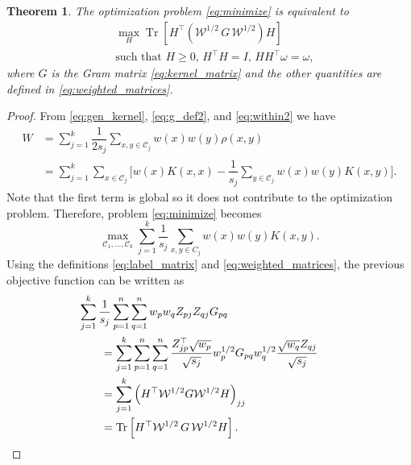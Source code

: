 \documentclass[10pt,journal,compsoc]{IEEEtran}
\newtheorem{theorem}{Theorem}
\DeclareMathOperator{\Tr}{Tr}
\newcommand\kk{K}
\newcommand\C{{\mathcal{C}}}
\newcommand\om{\omega}
\begin{document}
\begin{theorem}
\label{th:qcqp3}
The optimization 
problem \eqref{eq:minimize} is equivalent to
\begin{equation}
\label{eq:qcqp3}
\begin{split}
&\max_H  \Tr \left[ H^\top \left(\mathcal{W}^{1/2} \, G \, 
\mathcal{W}^{1/2}\right) H  \right] \\
&\mbox{such that $H \ge 0$, $H^\top H = I$, $H H^\top \om = \om$,}
\end{split}
\end{equation}
where $G$ is the Gram matrix \eqref{eq:kernel_matrix} 
and the other quantities are defined in \eqref{eq:weighted_matrices}.
\end{theorem}
\begin{proof}
From 
\eqref{eq:gen_kernel},
\eqref{eq:g_def2}, and
\eqref{eq:within2}
we have
\begin{equation}
\label{eq:W2}
\begin{split}
\!\! \!\!     W
&= \sum_{j=1}^k \dfrac{1}{2 s_j} 
\!\sum_{x,y \in \C_j} w(x)w(y)\rho(x,y) \\
&= \! \sum_{j=1}^k   \sum_{x \in \C_j} \!\! \bigg[
w(x)\kk(x,x) \!  - \! \dfrac{1}{s_j} \! \sum_{y \in \C_j} \!w(x)w(y) \kk(x,y) \bigg].
\end{split}
\end{equation}
Note that the first term is global so it does not contribute to the 
optimization problem.
Therefore, problem \eqref{eq:minimize} becomes
\begin{equation}
\label{eq:max_prob}
\max_{ \C_1,\dotsc,\C_k } 
\sum_{j=1}^k \dfrac{1}{s_j} \sum_{x,y\in C_j} w(x) w(y) \kk(x,y) .
\end{equation}
Using the definitions 
\eqref{eq:label_matrix} and 
\eqref{eq:weighted_matrices}, the previous 
objective function can be written as
\begin{equation}
\begin{split}
& \hspace{-2em} \sum_{j=1}^k \dfrac{1}{s_j} 
\sum_{p=1}^n \sum_{q=1}^n 
w_p w_q Z_{pj} Z_{qj} G_{pq}  \\
&= 
\sum_{j=1}^k 
\sum_{p=1}^n \sum_{q=1}^n 
\dfrac{Z^\top_{jp}\sqrt{w_p}}{\sqrt{s_j}} w_p^{1/2} G_{pq} w_q^{1/2} 
\dfrac{\sqrt{w_q} Z_{qj}}{\sqrt{s_j}} \\
&= 
\sum_{j=1}^k \left(H^\top \mathcal{W}^{1/2} G \mathcal{W}^{1/2} H\right)_{jj}
\\
&= \Tr\left[ H^\top \mathcal{W}^{1/2} \, G \, \mathcal{W}^{1/2} H  \right].
\end{split}
\end{equation}


\end{proof}
\end{document}
